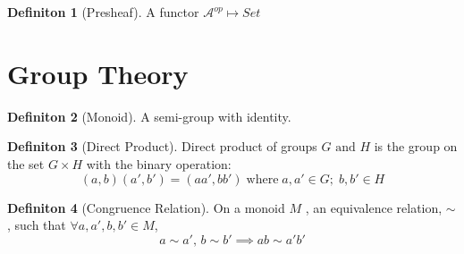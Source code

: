 \documentclass{article}
\theoremstyle{definition}
\theoremstyle{definition}
\newtheorem{definition}{Definiton}[section]
\begin{document}
\begin{definition}[Presheaf] %
	A functor $ \mathcal{A} ^{op} \mapsto Set$
\end{definition}

\section{Group Theory}

\begin{definition}[Monoid] %
	A semi-group with identity.
\end{definition}

\begin{definition}[Direct Product] %
	Direct product of groups $ G \text{ and } H $ is the group on the set $ G \times H $ with the binary operation:
\[ (a,b)(a',b')=(aa',bb') \; \text{where} \; a,a' \in G; \; b,b' \in H\]
\end{definition}

\begin{definition}[Congruence Relation] %
On a monoid $ M $ , an equivalence relation, $ \sim $ , such that $ \forall a,a',b,b' \in M $,
\[ a \sim a' ,\, b\sim b' \implies ab \sim a'b'  \]
\end{definition}
\end{document}

